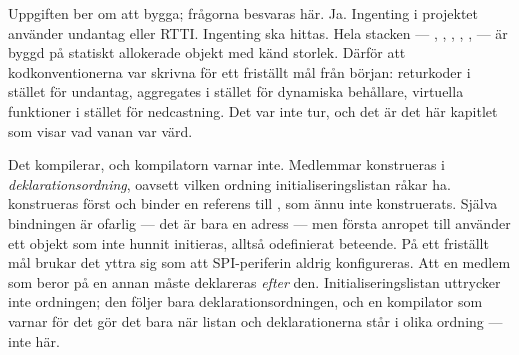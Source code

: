 Uppgiften ber om att bygga; frågorna besvaras här.
 Ja. Ingenting i projektet använder undantag eller RTTI.
 Ingenting ska hittas. Hela stacken --- , , ,
, ,  --- är byggd på statiskt allokerade objekt med
känd storlek.
 Därför att kodkonventionerna var skrivna för ett friställt mål från början: returkoder i
stället för undantag, aggregates i stället för dynamiska behållare, virtuella funktioner i
stället för nedcastning. Det var inte tur, och det är det här kapitlet som visar vad vanan var
värd.

 Det kompilerar, och kompilatorn varnar inte. Medlemmar konstrueras i
\emph{deklarationsordning}, oavsett vilken ordning initialiseringslistan råkar ha.
  konstrueras först och binder en referens till , som ännu
inte konstruerats. Själva bindningen är ofarlig --- det är bara en adress --- men första anropet
till  använder ett objekt som inte hunnit initieras, alltså odefinierat beteende.
På ett friställt mål brukar det yttra sig som att SPI-periferin aldrig konfigureras.
 Att en medlem som beror på en annan måste deklareras \emph{efter} den. Initialiseringslistan
uttrycker inte ordningen; den följer bara deklarationsordningen, och en kompilator som varnar för
det gör det bara när listan och deklarationerna står i olika ordning --- inte här.

